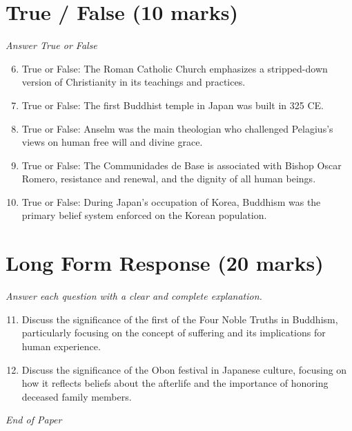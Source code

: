 \documentclass[12pt]{article}
\begin{document}
\section*{True / False (10 marks)}
\textit{Answer True or False}
\begin{enumerate}[label=\arabic*.]
\setcounter{enumi}{5}
\item True or False: The Roman Catholic Church emphasizes a stripped-down version of Christianity in its teachings and practices.
\item True or False: The first Buddhist temple in Japan was built in 325 CE.
\item True or False: Anselm was the main theologian who challenged Pelagius's views on human free will and divine grace.
\item True or False: The Communidades de Base is associated with Bishop Oscar Romero, resistance and renewal, and the dignity of all human beings.
\item True or False: During Japan's occupation of Korea, Buddhism was the primary belief system enforced on the Korean population.
\end{enumerate}

\section*{Long Form Response (20 marks)}
\textit{Answer each question with a clear and complete explanation.}
\begin{enumerate}[label=\arabic*.]
\setcounter{enumi}{10}
\item Discuss the significance of the first of the Four Noble Truths in Buddhism, particularly focusing on the concept of suffering and its implications for human experience.
\item Discuss the significance of the Obon festival in Japanese culture, focusing on how it reflects beliefs about the afterlife and the importance of honoring deceased family members.
\end{enumerate}

\vfill
\noindent\textit{End of Paper}
\end{document}
